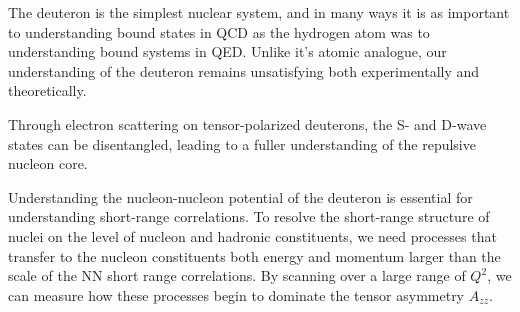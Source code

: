 


The deuteron is the simplest nuclear system, and in many ways it is as important to understanding bound states in QCD as the hydrogen atom was to understanding bound systems in QED.  Unlike it's atomic analogue, our understanding of the deuteron remains unsatisfying both experimentally and theoretically.  

Through electron scattering on tensor-polarized deuterons, the S- and D-wave states can be disentangled, leading to a fuller understanding of the repulsive nucleon core. 

Understanding the nucleon-nucleon potential of the deuteron is essential for understanding short-range correlations. To resolve the short-range structure of nuclei on the level of nucleon and hadronic constituents, we need processes that transfer to the nucleon constituents both energy and momentum larger than the scale of the NN short range correlations. By scanning over a large range of $Q^2$, we can measure how these processes begin to dominate the tensor asymmetry $A_{zz}$.



